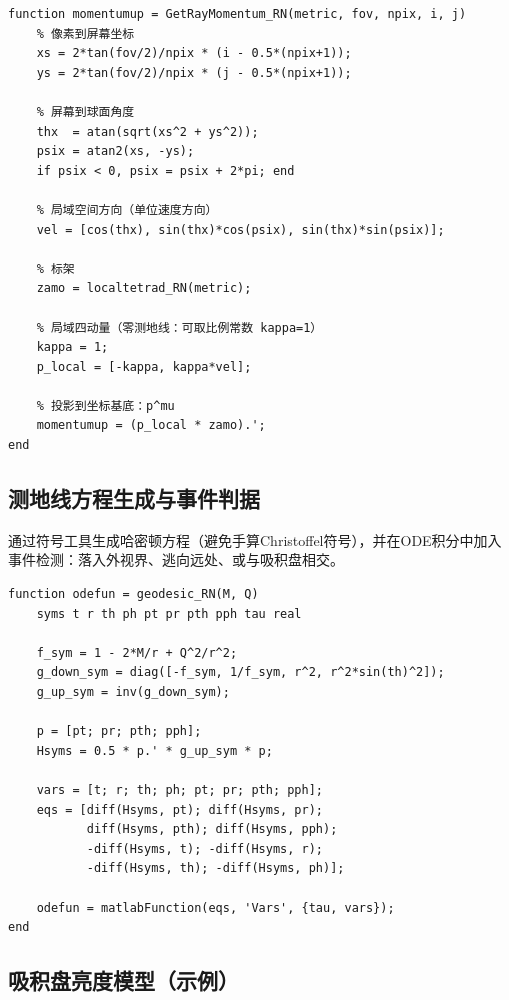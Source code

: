 \documentclass[a4paper,12pt]{article}
\numberwithin{equation}{section}
\begin{document}
\begin{lstlisting}[caption={像素到初始四动量映射 \texttt{GetRayMomentum\_RN}}]
function momentumup = GetRayMomentum_RN(metric, fov, npix, i, j)
    % 像素到屏幕坐标
    xs = 2*tan(fov/2)/npix * (i - 0.5*(npix+1));
    ys = 2*tan(fov/2)/npix * (j - 0.5*(npix+1));

    % 屏幕到球面角度
    thx  = atan(sqrt(xs^2 + ys^2));
    psix = atan2(xs, -ys);
    if psix < 0, psix = psix + 2*pi; end

    % 局域空间方向（单位速度方向）
    vel = [cos(thx), sin(thx)*cos(psix), sin(thx)*sin(psix)];

    % 标架
    zamo = localtetrad_RN(metric);

    % 局域四动量（零测地线：可取比例常数 kappa=1）
    kappa = 1;
    p_local = [-kappa, kappa*vel];

    % 投影到坐标基底：p^mu
    momentumup = (p_local * zamo).';
end
\end{lstlisting}

\subsection{测地线方程生成与事件判据}

通过符号工具生成哈密顿方程（避免手算Christoffel符号），并在ODE积分中加入事件检测：落入外视界、逃向远处、或与吸积盘相交。

\begin{lstlisting}[caption={测地线方程生成 \texttt{geodesic\_RN}}]
function odefun = geodesic_RN(M, Q)
    syms t r th ph pt pr pth pph tau real

    f_sym = 1 - 2*M/r + Q^2/r^2;
    g_down_sym = diag([-f_sym, 1/f_sym, r^2, r^2*sin(th)^2]);
    g_up_sym = inv(g_down_sym);

    p = [pt; pr; pth; pph];
    Hsyms = 0.5 * p.' * g_up_sym * p;

    vars = [t; r; th; ph; pt; pr; pth; pph];
    eqs = [diff(Hsyms, pt); diff(Hsyms, pr);
           diff(Hsyms, pth); diff(Hsyms, pph);
           -diff(Hsyms, t); -diff(Hsyms, r);
           -diff(Hsyms, th); -diff(Hsyms, ph)];

    odefun = matlabFunction(eqs, 'Vars', {tau, vars});
end
\end{lstlisting}

\subsection{吸积盘亮度模型（示例）}
\end{document}
